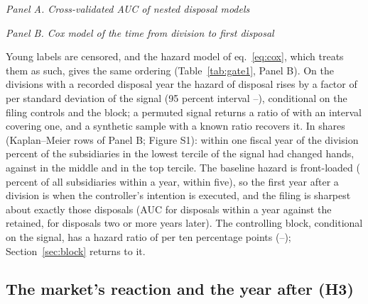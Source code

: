 \begin{table}[htbp]
\centering
\caption{Nested disposal models and the hazard of disposal}\label{tab:gate1}
{\footnotesize\singlespacing\setlength{\tabcolsep}{3pt}
\emph{Panel A. Cross-validated AUC of nested disposal models}\par\smallskip
\par\medskip
\emph{Panel B. Cox model of the time from division to first disposal}\par\smallskip
}
\end{table}

Young labels are censored, and the hazard model of eq.~\eqref{eq:cox}, which treats them as such, gives the same ordering (Table~\ref{tab:gate1}, Panel B). On the \CoxN{} divisions with a recorded disposal year the hazard of disposal rises by a factor of \CoxHRSD{} per standard deviation of the signal (95 percent interval \CoxHRSDLo--\CoxHRSDHi), conditional on the filing controls and the block; a permuted signal returns a ratio of \CoxPermHR{} with an interval covering one, and a synthetic sample with a known ratio recovers it. In shares (Kaplan--Meier rows of Panel B; Figure S1): within one fiscal year of the division \KMLowOneY{} percent of the subsidiaries in the lowest tercile of the signal had changed hands, against \KMMidOneY{} in the middle and \KMHighOneY{} in the top tercile. The baseline hazard is front-loaded (\KMAllOneY{} percent of all subsidiaries within a year, \KMAllFiveY{} within five), so the first year after a division is when the controller's intention is executed, and the filing is sharpest about exactly those disposals (AUC \AUCEarlyPooled{} for disposals within a year against the retained, \AUCLateVsNever{} for disposals two or more years later). The controlling block, conditional on the signal, has a hazard ratio of \CoxHRBlock{} per ten percentage points (\CoxHRBlockLo--\CoxHRBlockHi); Section~\ref{sec:block} returns to it.


\subsection{The market's reaction and the year after (H3)}\label{sec:market}

